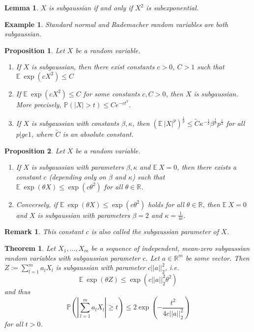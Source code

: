 \documentclass[10pt,a4paper]{article}
\theoremstyle{thmstyle}
\newtheorem{lemma}{Lemma}
\newtheorem{theorem}{Theorem}
\newtheorem{example}{Example}
\newtheorem{proposition}{Proposition}
\newtheorem{remark}{Remark}
\newcommand{\E}{\mathbb{E}~}
\renewcommand{\Pr}[1]{\mathbb{P}\left( #1 \right)}
\begin{document}
\begin{lemma}
  $X$ is subgaussian if and only if $X^{2}$ is subexponential.
\end{lemma}

\begin{example}
  Standard normal and Rademacher random variables are both subgaussian.
\end{example}

\begin{proposition}
  Let $X$ be a random variable.
  \begin{enumerate}
  \item If $X$ is subgaussian, then there exist constants $c > 0$, $C > 1$ such that $\E \exp(c X^{2}) \le C$
  \item If $\E \exp(c X^{2}) \le C$ for some constants $c, C > 0$, then $X$ is subgaussian.
    More precisely, $\Pr{|X| > t} \le C e^{-c t^{2}}$.
  \item If $X$ is subgaussian with constants $\beta, \kappa$, then $\left( \E |X|^{p} \right)^{\frac{1}{p}} \le \tilde{C} \kappa^{-\frac{1}{2}} \beta^{\frac{1}{p}} p^{\frac{1}{2}}$ for all $p |ge 1$, where $\tilde{C}$ is an absolute constant.
  \end{enumerate}
\end{proposition}

\begin{proposition}
  Let $X$ be a random variable.
  \begin{enumerate}
  \item If $X$ is subgaussian with parameters $\beta, \kappa$ and $\E X = 0$, then there exists a constant $c$ (depending only on $\beta$ and $\kappa$) such that $\E \exp(\theta X) \le \exp(c \theta^{2})$ for all $\theta \in \mathbb{R}$.
  \item Conversely, if $\E \exp(\theta X) \le \exp(c \theta^{2})$ holds for all $\theta \in \mathbb{R}$, then $\E X = 0$ and $X$ is subgaussian with parameters $\beta = 2$ and $\kappa = \frac{1}{4c}$.
  \end{enumerate}
\end{proposition}

\begin{remark}
  This constant $c$ is also called the \emph{subgaussian parameter} of $X$.
\end{remark}

\begin{theorem}
  Let $X_{1}, \dots, X_{m}$ be a sequence of independent, mean-zero subgaussian random variables with subgaussian parameter $c$.
  Let $a \in \mathbb{R}^{m}$ be some vector.
  Then $Z := \sum_{l = 1}^{m} a_{l} X_{l}$ is subgaussian with parameter $c||a||_{2}^{2}$, i.e.
  \begin{equation*}
    \E \exp(\theta Z) \le \exp\left( c||a||_{2}^{2} \theta^{2} \right)
  \end{equation*}
  and thus
  \begin{equation*}
    \Pr{\left| \sum_{l = 1}^{m} a_{l} X_{l} \right| \ge t} \le 2 \exp\left( -\frac{t^{2}}{4c||a||_{2}^{2}} \right)
  \end{equation*}
  for all $t > 0$.
\end{theorem}
\end{document}
